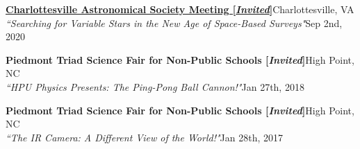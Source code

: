\documentclass[letterpaper,12pt]{article}
\begin{document}
\begin{etaremune}
    \item \href{https://www.cvilleastro.com/#}{{\small\textbf{Charlottesville Astronomical Society Meeting [\textit{Invited}]}}}\hfill{\small Charlottesville, VA}\\
    {\footnotesize \textit{``Searching for Variable Stars in the New Age of Space-Based Surveys"}\hfill \footnotesize Sep 2nd, 2020}
    \item {\small\textbf{Piedmont Triad Science Fair for Non-Public Schools [\textit{Invited}]}}\hfill{\small High Point, NC}\\
    {\footnotesize \textit{``HPU Physics Presents: The Ping-Pong Ball Cannon!"}\hfill \footnotesize Jan 27th, 2018}
    \item {\small\textbf{Piedmont Triad Science Fair for Non-Public Schools [\textit{Invited}]}}\hfill{\small High Point, NC}\\
    {\footnotesize \textit{``The IR Camera: A Different View of the World!"}\hfill \footnotesize Jan 28th, 2017}
\end{etaremune}

\vspace{3mm}
\noindent{}
\end{document}
